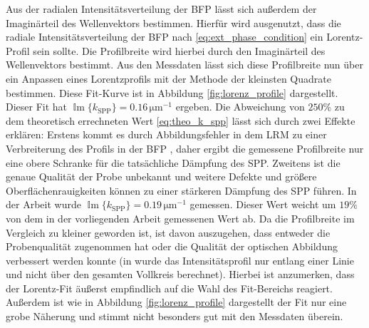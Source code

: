 \documentclass[titlepage,  ngerman]{article}
\renewcommand{\Im}{\operatorname{\mathbb{I}m}}
\begin{document}
	Aus der radialen Intensitätsverteilung der BFP lässt sich außerdem der Imaginärteil des Wellenvektors bestimmen. Hierfür  wird ausgenutzt, dass die radiale Intensitätsverteilung der BFP nach \eqref{eq:ext_phase_condition} ein Lorentz-Profil sein sollte. Die Profilbreite wird hierbei durch den Imaginärteil des Wellenvektors bestimmt. Aus den Messdaten lässt sich diese Profilbreite nun über ein Anpassen eines Lorentzprofils mit der Methode der kleinsten Quadrate bestimmen. Diese Fit-Kurve ist in Abbildung \ref{fig:lorenz_profile} dargestellt. Dieser Fit hat $\Im\{k_\mathrm{SPP}\} = 0.16\,\mathrm{\mu m}^{-1}$ ergeben. Die Abweichung von $250\%$ zu dem theoretisch errechneten Wert \ref{eq:theo_k_spp} lässt sich durch zwei Effekte erklären: Erstens kommt es durch Abbildungsfehler in dem LRM zu einer Verbreiterung des Profils in der BFP \cite{Jaruschewski.2020}, daher ergibt die gemessene Profilbreite nur eine obere Schranke für die tatsächliche Dämpfung des SPP. Zweitens ist die genaue Qualität der Probe unbekannt und weitere Defekte und größere Oberflächenrauigkeiten können zu einer stärkeren Dämpfung des SPP führen. In der Arbeit \cite{Jaruschewski.2020} wurde  $\Im\{k_\mathrm{SPP}\} = 0.19\,\mathrm{\mu m}^{-1}$ gemessen. Dieser Wert weicht um $19\%$ von dem in der vorliegenden Arbeit gemessenen Wert ab. Da die Profilbreite im Vergleich zu \cite{Jaruschewski.2020} kleiner geworden ist, ist davon auszugehen, dass entweder die Probenqualität zugenommen hat oder die Qualität der optischen Abbildung verbessert werden konnte (in \cite{Jaruschewski.2020} wurde das Intensitätsprofil nur entlang einer Linie und nicht über den gesamten Vollkreis berechnet). Hierbei ist anzumerken, dass der Lorentz-Fit äußerst empfindlich auf die Wahl des Fit-Bereichs reagiert. Außerdem ist wie in Abbildung \ref{fig:lorenz_profile} dargestellt der Fit nur eine grobe Näherung und stimmt nicht besonders gut mit den Messdaten überein.	
	
\end{document}
